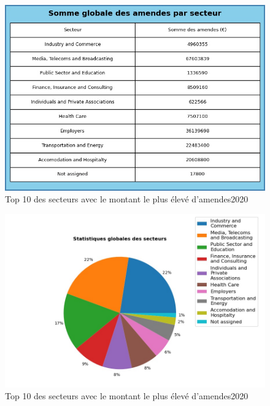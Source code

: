 \documentclass[french]{article}
\begin{document}
		
	\begin{multicols}{2}
	\begin{figure}
		[H]\centering\includegraphics[width=1.0\linewidth]{graphs/sector_data_year_fines}
		\caption{Top 10 des secteurs avec le montant le plus élevé d'amendes2020}
	\end{figure}
	\begin{figure}
		[H]\centering\includegraphics[width=1\linewidth]{graphs/sector_data_year}
		\caption{Top 10 des secteurs avec le montant le plus élevé d'amendes2020}
	 \end{figure}
	
	\end{multicols}
\end{document}
